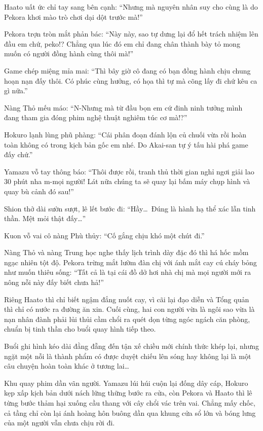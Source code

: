 \documentclass[../main.tex]{subfiles}
\begin{document}
Haato uất ức chỉ tay sang bên cạnh: ``Nhưng mà nguyên nhân suy cho cùng là do Pekora khơi mào trò chơi dại dột trước mà!''

Pekora trợn tròn mắt phản bác: ``Này này, sao tự dưng lại đổ hết trách nhiệm lên đầu em chứ, peko!? Chẳng qua lúc đó em chỉ đang chân thành bày tỏ mong muốn có người đồng hành cùng thôi mà!''

Game chép miệng mỉa mai: ``Thì bây giờ cô đang có bạn đồng hành chịu chung hoạn nạn đấy thôi. Có phúc cùng hưởng, có họa thì tự mà cõng lấy đi chứ kêu ca gì nữa.''

Nàng Thỏ mếu máo: ``N-Nhưng mà từ đầu bọn em cứ đinh ninh tưởng mình đang tham gia đóng phim nghệ thuật nghiêm túc cơ mà!?''

Hokuro lạnh lùng phũ phàng: ``Cái phân đoạn đánh lộn củ chuối vừa rồi hoàn toàn không có trong kịch bản gốc em nhé. Do Akai-san tự ý tấu hài phá game đấy chứ.''

Yamazu vỗ tay thông báo: ``Thôi được rồi, tranh thủ thời gian nghỉ ngơi giải lao 30 phút nha m-mọi người! Lát nữa chúng ta sẽ quay lại bấm máy chụp hình và quay bù cảnh đó sau!''

Shion thở dài sườn sượt, lê lết bước đi: ``Hầy\dots\ Đúng là hành hạ thể xác lẫn tinh thần. Mệt mỏi thật đấy\dots''

Kuon vỗ vai cô nàng Phù thủy: ``Cố gắng chịu khó một chút đi.''

Nàng Thỏ và nàng Trung học nghe thấy lịch trình dày đặc đó thì há hốc mồm ngạc nhiên tột độ. Pekora trừng mắt lườm đàn chị với ánh mắt cay cú cháy bỏng như muốn thiêu sống: ``Tất cả là tại cái đồ dở hơi nhà chị mà mọi người mới ra nông nỗi này đấy biết chưa hả!''

Riêng Haato thì chỉ biết ngậm đắng nuốt cay, vì cãi lại đạo diễn và Tổng quản thì chỉ có nước ra đường ăn xin. Cuối cùng, hai con người vừa là ngôi sao vừa là nạn nhân đành phải lủi thủi cầm chổi ra quét dọn từng ngóc ngách căn phòng, chuẩn bị tinh thần cho buổi quay hình tiếp theo.

Buổi ghi hình kéo dài đằng đẵng đến tận xế chiều mới chính thức khép lại, nhưng ngặt một nỗi là thành phẩm có được duyệt chiếu lên sóng hay không lại là một câu chuyện hoàn toàn khác ở tương lai\dots

\il


Khu quay phim dần vãn người. Yamazu lúi húi cuộn lại đống dây cáp, Hokuro kẹp xấp kịch bản dưới nách lững thững bước ra cửa, còn Pekora và Haato thì lê từng bước thảm hại xuống cầu thang với cây chổi vác trên vai. Chẳng mấy chốc, cả tầng chỉ còn lại ánh hoàng hôn buông dần qua khung cửa sổ lớn và bóng lưng của một người vẫn chưa chịu rời đi.
\end{document}
